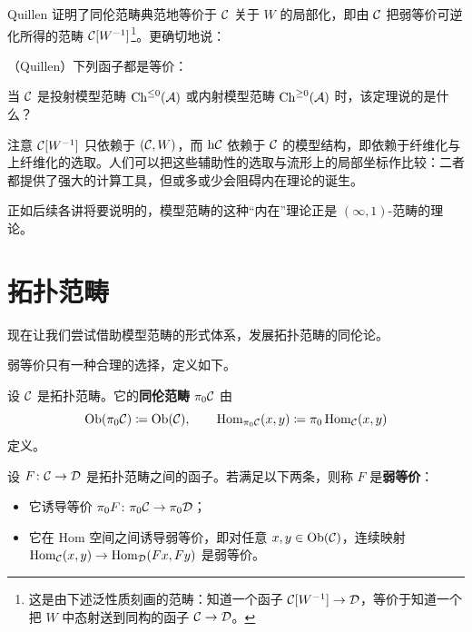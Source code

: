 \nitem\label{L2-2.21} Quillen 证明了同伦范畴典范地等价于 $\mathcal{C}$ 关于 $W$ 的局部化，即由 $\mathcal{C}$ 把弱等价可逆化所得的范畴 $\mathcal{C}[W^{-1}]$\footnote{这是由下述泛性质刻画的范畴：知道一个函子 $\mathcal{C}[W^{-1}]\to\mathcal{D}$，等价于知道一个把 $W$ 中态射送到同构的函子 $\mathcal{C}\to\mathcal{D}$。}。更确切地说：

\begin{theorem}\label{L2-2.22}
（Quillen）下列函子都是等价：
\begin{center}
\end{center}
\end{theorem}

\begin{exercise}\label{L2-2.23}
当 $\mathcal{C}$ 是投射模型范畴 $\operatorname{Ch}^{\le0}(\mathcal{A})$ 或内射模型范畴 $\operatorname{Ch}^{\ge0}(\mathcal{A})$ 时，该定理说的是什么？
\end{exercise}

\begin{remark}\label{L2-2.24}
注意 $\mathcal{C}[W^{-1}]$ 只依赖于 $(\mathcal{C},W)$，而 $\mathrm{h}\mathcal{C}$ 依赖于 $\mathcal{C}$ 的模型结构，即依赖于纤维化与上纤维化的选取。人们可以把这些辅助性的选取与流形上的局部坐标作比较：二者都提供了强大的计算工具，但或多或少会阻碍内在理论的诞生。
\end{remark}

正如后续各讲将要说明的，模型范畴的这种“内在”理论正是 $(\infty,1)$-范畴的理论。

\section{拓扑范畴}

\nitem\label{L2-3.1} 现在让我们尝试借助模型范畴的形式体系，发展拓扑范畴的同伦论。

\nitem\label{L2-3.2} 弱等价只有一种合理的选择，定义如下。

\begin{definition}\label{L2-3.3}
设 $\mathcal{C}$ 是拓扑范畴。它的\textbf{同伦范畴} $\pi_0\mathcal{C}$ 由
\[
\operatorname{Ob}(\pi_0\mathcal{C})\coloneqq\operatorname{Ob}(\mathcal{C}),\qquad
\operatorname{Hom}_{\pi_0\mathcal{C}}(x,y)\coloneqq\pi_0\operatorname{Hom}_{\mathcal{C}}(x,y)
\]
定义。
\end{definition}

\begin{definition}\label{L2-3.4}
设 $F\colon\mathcal{C}\to\mathcal{D}$ 是拓扑范畴之间的函子。若满足以下两条，则称 $F$ 是\textbf{弱等价}：
\begin{itemize}[leftmargin=2.2em,itemsep=0.1em]
\item 它诱导等价 $\pi_0F\colon\pi_0\mathcal{C}\to\pi_0\mathcal{D}$；
\item 它在 Hom 空间之间诱导弱等价，即对任意 $x,y\in\operatorname{Ob}(\mathcal{C})$，连续映射 $\operatorname{Hom}_{\mathcal{C}}(x,y)\to\operatorname{Hom}_{\mathcal{D}}(Fx,Fy)$ 是弱等价。
\end{itemize}
\end{definition}

